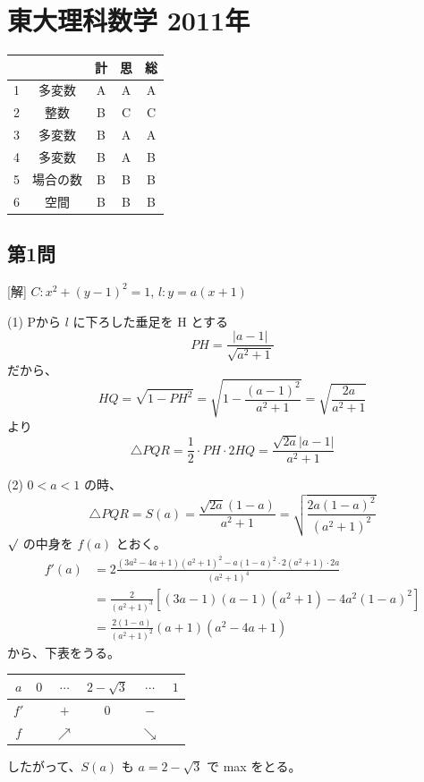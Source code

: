 \documentclass[../main.tex]{subfiles}
\begin{document}
\section*{東大理科数学 2011年}

\begin{center}
  \begin{tabular}{|c|c|c|c|c|}
    \hline
    & & 計 & 思 & 総 \\
    \hline
    1 & 多変数 & A & A & A \\
    \hline
    2 & 整数 & B & C & C \\
    \hline
    3 & 多変数 & B & A & A \\
    \hline
    4 & 多変数 & B & A & B \\
    \hline
    5 & 場合の数 & B & B & B \\
    \hline
    6 & 空間 & B & B & B \\
    \hline
  \end{tabular}
\end{center}

\subsection*{第1問}
[解] $C: x^2 + (y-1)^2 = 1$, $l: y = a(x+1)$

(1) Pから $l$ に下ろした垂足を H とする
\[ PH = \frac{|a-1|}{\sqrt{a^2+1}} \]
だから、
\[ HQ = \sqrt{1 - PH^2} = \sqrt{1 - \frac{(a-1)^2}{a^2+1}} = \sqrt{\frac{2a}{a^2+1}} \]
より
\[ \triangle PQR = \frac{1}{2} \cdot PH \cdot 2HQ = \frac{\sqrt{2a}|a-1|}{a^2+1} \]

(2) $0 < a < 1$ の時、
\[ \triangle PQR = S(a) = \frac{\sqrt{2a}(1-a)}{a^2+1} = \sqrt{\frac{2a(1-a)^2}{(a^2+1)^2}} \]
$\sqrt{\vphantom{x}}$ の中身を $f(a)$ とおく。
\begin{align*}
  f'(a) &= 2 \frac{ (3a^2-4a+1)(a^2+1)^2 - a(1-a)^2 \cdot 2(a^2+1) \cdot 2a }{(a^2+1)^4} \\
  &= \frac{2}{(a^2+1)^3} \left[ (3a-1)(a-1)(a^2+1) - 4a^2(1-a)^2 \right] \\
  &= \frac{2(1-a)}{(a^2+1)^2} (a+1) (a^2-4a+1)
\end{align*}
から、下表をうる。

\begin{center}
  \begin{tabular}{|c|c|c|c|c|c|}
    \hline
    $a$ & $0$ & $\cdots$ & $2-\sqrt{3}$ & $\cdots$ & $1$ \\
    \hline
    $f'$ & & $+$ & $0$ & $-$ & \\
    \hline
    $f$ & & $\nearrow$ & & $\searrow$ & \\
    \hline
  \end{tabular}
\end{center}
したがって、$S(a)$ も $a=2-\sqrt{3}$ で max をとる。
\end{document}
